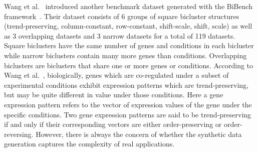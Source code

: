 Wang et al.~\cite{wang2016unibic} introduced another benchmark dataset generated with the BiBench framework~\cite{eren2012comparative}.
Their dataset consists of 6 groups of square bicluster structures (trend-preserving, column-constant, row-constant, shift-scale, shift, scale) as well as 3 overlapping datasets and 3 narrow datasets for a total of 119 datasets.
Square biclusters have the same number of genes and conditions in each bicluster while narrow biclusters contain many more genes than conditions.
Overlapping biclusters are biclusters that share one or more genes or conditions. 
According to Wang et al.~\cite{wang2016unibic}, biologically, genes which are co-regulated under a subset of experimental conditions exhibit expression patterns which are trend-preserving, but may be quite different in value under those conditions.
Here a gene expression pattern refers to the vector of expression values of the gene under the specific conditions.
Two gene expression patterns are said to be trend-preserving if and only if their corresponding vectors are either order-preserving or order-reversing.
However, there is always the concern of whether the synthetic data generation captures the complexity of real applications. 
